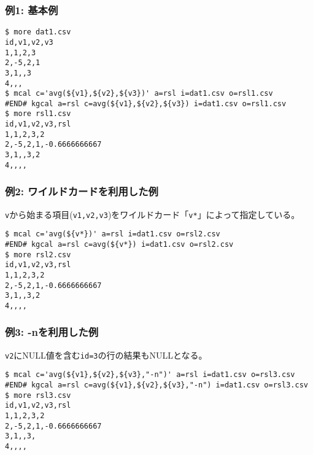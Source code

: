 \subsubsection*{例1: 基本例}



\begin{Verbatim}[baselinestretch=0.7,frame=single]
$ more dat1.csv
id,v1,v2,v3
1,1,2,3
2,-5,2,1
3,1,,3
4,,,
$ mcal c='avg(${v1},${v2},${v3})' a=rsl i=dat1.csv o=rsl1.csv
#END# kgcal a=rsl c=avg(${v1},${v2},${v3}) i=dat1.csv o=rsl1.csv
$ more rsl1.csv
id,v1,v2,v3,rsl
1,1,2,3,2
2,-5,2,1,-0.6666666667
3,1,,3,2
4,,,,
\end{Verbatim}
\subsubsection*{例2: ワイルドカードを利用した例}

\verb|v|から始まる項目(\verb|v1,v2,v3|)をワイルドカード「\verb|v*|」によって指定している。


\begin{Verbatim}[baselinestretch=0.7,frame=single]
$ mcal c='avg(${v*})' a=rsl i=dat1.csv o=rsl2.csv
#END# kgcal a=rsl c=avg(${v*}) i=dat1.csv o=rsl2.csv
$ more rsl2.csv
id,v1,v2,v3,rsl
1,1,2,3,2
2,-5,2,1,-0.6666666667
3,1,,3,2
4,,,,
\end{Verbatim}
\subsubsection*{例3: -nを利用した例}

\verb|v2|にNULL値を含む\verb|id=3|の行の結果もNULLとなる。


\begin{Verbatim}[baselinestretch=0.7,frame=single]
$ mcal c='avg(${v1},${v2},${v3},"-n")' a=rsl i=dat1.csv o=rsl3.csv
#END# kgcal a=rsl c=avg(${v1},${v2},${v3},"-n") i=dat1.csv o=rsl3.csv
$ more rsl3.csv
id,v1,v2,v3,rsl
1,1,2,3,2
2,-5,2,1,-0.6666666667
3,1,,3,
4,,,,
\end{Verbatim}

